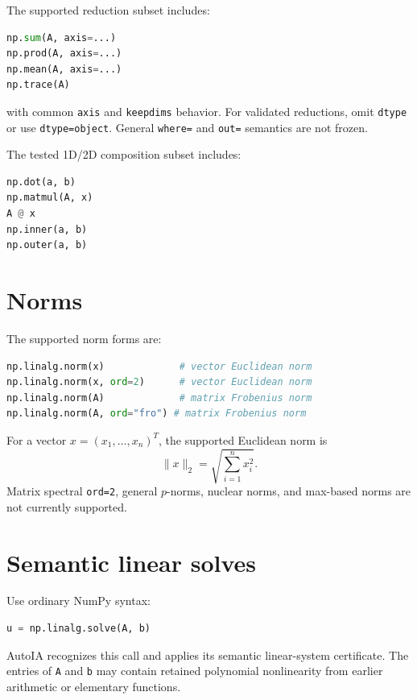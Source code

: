 \documentclass[11pt]{article}
\begin{document}
The supported reduction subset includes:
\begin{lstlisting}[language=Python]
np.sum(A, axis=...)
np.prod(A, axis=...)
np.mean(A, axis=...)
np.trace(A)
\end{lstlisting}
with common \texttt{axis} and \texttt{keepdims} behavior.  For validated
reductions, omit \texttt{dtype} or use \texttt{dtype=object}.  General
\texttt{where=} and \texttt{out=} semantics are not frozen.

The tested 1D/2D composition subset includes:
\begin{lstlisting}[language=Python]
np.dot(a, b)
np.matmul(A, x)
A @ x
np.inner(a, b)
np.outer(a, b)
\end{lstlisting}

\section{Norms}

The supported norm forms are:
\begin{lstlisting}[language=Python]
np.linalg.norm(x)             # vector Euclidean norm
np.linalg.norm(x, ord=2)      # vector Euclidean norm
np.linalg.norm(A)             # matrix Frobenius norm
np.linalg.norm(A, ord="fro") # matrix Frobenius norm
\end{lstlisting}

For a vector \(x=(x_1,\ldots,x_n)^T\), the supported Euclidean norm is
\[
\|x\|_2=\sqrt{\sum_{i=1}^n x_i^2}.
\]
Matrix spectral \texttt{ord=2}, general \(p\)-norms, nuclear norms, and max-based
norms are not currently supported.

\section{Semantic linear solves}

Use ordinary NumPy syntax:
\begin{lstlisting}[language=Python]
u = np.linalg.solve(A, b)
\end{lstlisting}

AutoIA recognizes this call and applies its semantic linear-system certificate.
The entries of \texttt{A} and \texttt{b} may contain retained polynomial
nonlinearity from earlier arithmetic or elementary functions.
\end{document}
